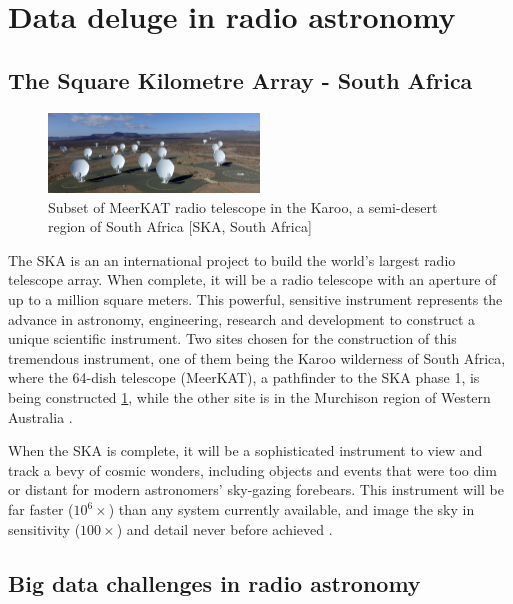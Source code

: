 
\section{Data deluge in radio astronomy}
\subsection{The Square Kilometre Array - South Africa}

\begin{figure}[H]
  \centering
    \includegraphics[width=0.5\textwidth]{images/MeerMeer.jpg}
    \caption{Subset of MeerKAT radio telescope in the Karoo, a semi-desert region of South Africa [SKA, South Africa]}
  \label{images/MeerKAT}
\end{figure}

The SKA is an an international project to build the world's largest radio telescope array. When complete, it will be a radio telescope with an aperture of up to a million square meters. This powerful, sensitive instrument represents the advance in astronomy, engineering, research and  development to construct a unique scientific instrument. Two sites chosen for the construction of this tremendous instrument, one of them being the Karoo wilderness of South Africa, where the 64-dish telescope (MeerKAT), a pathfinder to the SKA phase 1, is being constructed \ref{images/MeerKAT}, while the other site is in the Murchison region of Western Australia \citep{hall2008square}.  

When the SKA is complete, it will be a sophisticated instrument to view and track a bevy of cosmic wonders, including objects and events that were too dim or distant for modern astronomers' sky-gazing forebears. This instrument will be far faster ($10^6\times$) than any system currently available, and image the sky in sensitivity ($100\times$) and detail never before achieved \citep{skatelescope}.

\subsection{Big data challenges in radio astronomy}

